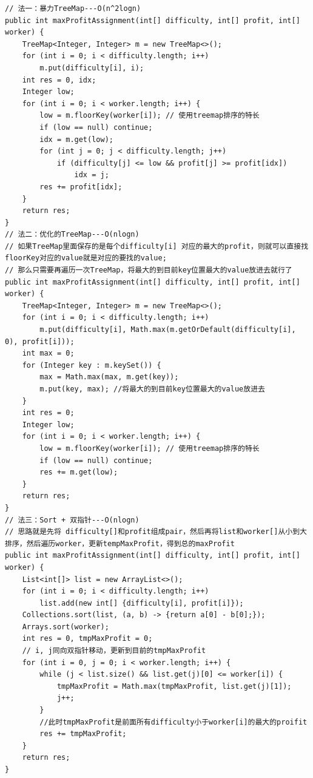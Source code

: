 \documentclass[9pt, b5paper]{article}
\begin{document}
\begin{verbatim}
// 法一：暴力TreeMap---O(n^2logn)
public int maxProfitAssignment(int[] difficulty, int[] profit, int[] worker) {
    TreeMap<Integer, Integer> m = new TreeMap<>();
    for (int i = 0; i < difficulty.length; i++) 
        m.put(difficulty[i], i);
    int res = 0, idx;
    Integer low;
    for (int i = 0; i < worker.length; i++) {
        low = m.floorKey(worker[i]); // 使用treemap排序的特长
        if (low == null) continue;
        idx = m.get(low);
        for (int j = 0; j < difficulty.length; j++) 
            if (difficulty[j] <= low && profit[j] >= profit[idx])
                idx = j;
        res += profit[idx];
    }
    return res;
}
// 法二：优化的TreeMap---O(nlogn)
// 如果TreeMap里面保存的是每个difficulty[i] 对应的最大的profit，则就可以直接找floorKey对应的value就是对应的要找的value;
// 那么只需要再遍历一次TreeMap，将最大的到目前key位置最大的value放进去就行了
public int maxProfitAssignment(int[] difficulty, int[] profit, int[] worker) {
    TreeMap<Integer, Integer> m = new TreeMap<>();
    for (int i = 0; i < difficulty.length; i++) 
        m.put(difficulty[i], Math.max(m.getOrDefault(difficulty[i], 0), profit[i]));
    int max = 0;
    for (Integer key : m.keySet()) { 
        max = Math.max(max, m.get(key));
        m.put(key, max); //将最大的到目前key位置最大的value放进去
    }
    int res = 0;
    Integer low;
    for (int i = 0; i < worker.length; i++) {
        low = m.floorKey(worker[i]); // 使用treemap排序的特长
        if (low == null) continue;
        res += m.get(low);
    }
    return res;
}
// 法三：Sort + 双指针---O(nlogn)
// 思路就是先将 difficulty[]和profit组成pair，然后再将list和worker[]从小到大排序，然后遍历worker，更新tempMaxProfit，得到总的maxProfit
public int maxProfitAssignment(int[] difficulty, int[] profit, int[] worker) {
    List<int[]> list = new ArrayList<>();
    for (int i = 0; i < difficulty.length; i++) 
        list.add(new int[] {difficulty[i], profit[i]});
    Collections.sort(list, (a, b) -> {return a[0] - b[0];});
    Arrays.sort(worker);
    int res = 0, tmpMaxProfit = 0;
    // i, j同向双指针移动，更新到目前的tmpMaxProfit
    for (int i = 0, j = 0; i < worker.length; i++) {
        while (j < list.size() && list.get(j)[0] <= worker[i]) {
            tmpMaxProfit = Math.max(tmpMaxProfit, list.get(j)[1]);
            j++;
        }
        //此时tmpMaxProfit是前面所有difficulty小于worker[i]的最大的proifit
        res += tmpMaxProfit;
    }
    return res;
}
\end{verbatim}
\end{document}
